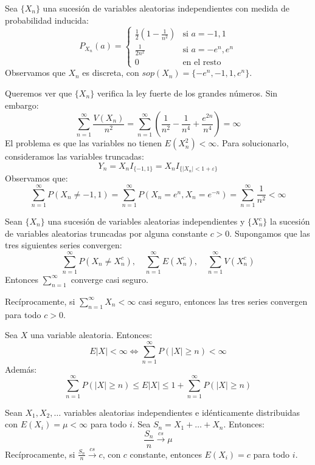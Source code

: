 \begin{example}
    Sea $\{X_n\}$ una sucesión de variables aleatorias independientes con medida de probabilidad inducida:
    $$P_{X_n}(a) = \begin{cases}
            \frac{1}{2}\left(1-\frac{1}{n^2}\right) & \text{si } a = -1, 1     \\
            \frac{1}{2n^2}                          & \text{si } a = -e^n, e^n \\
            0                                       & \text{en el resto}
        \end{cases}$$
    Observamos que $X_n$ es discreta, con $sop(X_n) = \{-e^n, -1, 1, e^n\}$.

    Queremos ver que $\{X_n\}$ verifica la ley fuerte de los grandes números.
    Sin embargo:
    $$\sum_{n=1}^\infty \frac{V(X_n)}{n^2} = \sum_{n=1}^\infty \left(\frac{1}{n^2} - \frac{1}{n^4} + \frac{e^{2n}}{n^4}\right) = \infty$$
    El problema es que las variables no tienen $E(X_n^2) < \infty$.
    Para solucionarlo, consideramos las variables truncadas:
    $$Y_n = X_nI_{\{-1, 1\}} = X_n I_{\{|X_n| < 1 + \varepsilon\}}$$
    Observamos que:
    $$\sum_{n=1}^\infty P(X_n \neq -1, 1) = \sum_{n=1}^\infty P(X_n = e^n, X_n = e^{-n}) = \sum_{n=1}^\infty \frac{1}{n^2} < \infty$$
\end{example}

\begin{theorem}
    Sean $\{X_n\}$ una sucesión de variables aleatorias independientes y $\{X_n^c\}$ la sucesión de variables aleatorias truncadas por alguna constante $c > 0$.
    Supongamos que las tres siguientes series convergen:
    $$\sum_{n=1}^\infty P(X_n \neq X_n^c), \quad \sum_{n=1}^\infty E(X_n^c), \quad \sum_{n=1}^\infty V(X_n^c)$$
    Entonces $\sum_{n=1}^\infty$ converge casi seguro.

    Recíprocamente, si $\sum_{n=1}^\infty X_n < \infty$ casi seguro, entonces las tres series convergen para todo $c > 0$.
\end{theorem}

\begin{lemma}
    Sea $X$ una variable aleatoria.
    Entonces:
    $$E|X| < \infty \Leftrightarrow \sum_{n=1}^\infty P(|X| \geq n) < \infty$$
    Además:
    $$\sum_{n=1}^\infty P(|X| \geq n) \leq E|X| \leq 1 + \sum_{n=1}^\infty P(|X| \geq n)$$
\end{lemma}

\begin{theorem}
    Sean $X_1, X_2, \dots$ variables aleatorias independientes e idénticamente distribuidas con $E(X_i) = \mu < \infty$ para todo $i$.
    Sea $S_n = X_1 + \dots + X_n$.
    Entonces:
    $$\frac{S_n}{n} \xrightarrow{cs} \mu$$
    Recíprocamente, si $\frac{S_n}{n} \xrightarrow{cs} c$, con $c$ constante, entonces $E(X_i) = c$ para todo $i$.
\end{theorem}

